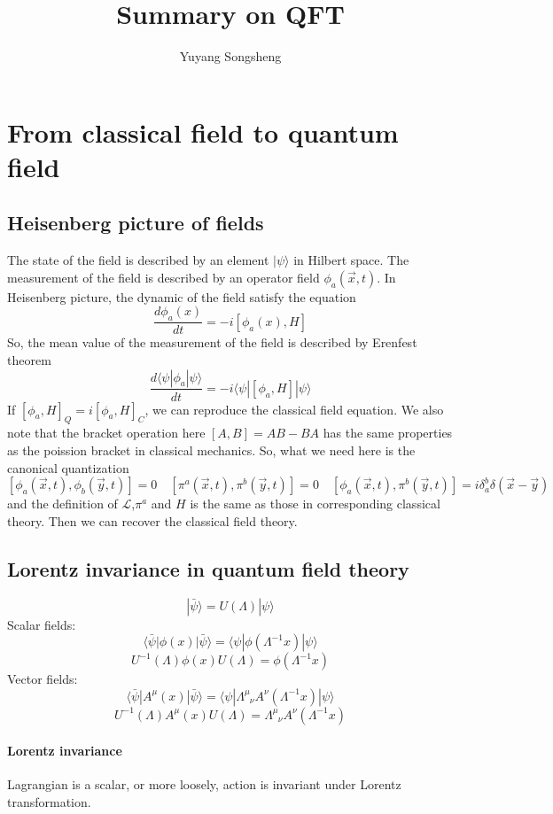 \documentclass{article}
\author{Yuyang Songsheng}
\title{Summary on QFT}
\begin{document}
\maketitle
\section{From classical field to quantum field}
\subsection{Heisenberg picture of fields}
The state of the field is described by an element $|\psi\rangle$ in Hilbert space. The measurement of the field is described by an operator field $\phi_a(\vec{x},t)$. In Heisenberg picture, the dynamic of the field satisfy the equation
\[\frac{d\phi_a(x)}{dt} = -i[\phi_a(x),H]\]
So, the mean value of the measurement of the field is described by Erenfest theorem
\[\frac{d\langle \psi| \phi_a | \psi \rangle}{dt} = -i \langle \psi | [\phi_a,H] | \psi \rangle\]
If $[\phi_a,H]_Q = i[\phi_a,H]_C$, we can reproduce the classical field equation. We also note that the bracket operation here $[A,B] = AB - BA$ has the same properties as the poission bracket in classical mechanics. So, what we need here is the canonical quantization
\[[\phi_a(\vec{x},t),\phi_b(\vec{y},t)] = 0 \quad [\pi^a(\vec{x},t),\pi^b(\vec{y},t)] = 0 \quad [\phi_a(\vec{x},t),\pi^b(\vec{y},t)] = i \delta_a^b \delta(\vec{x}-\vec{y}) \]
and the definition of $\mathcal{L}$,$\pi^a$ and $H$ is the same as those in corresponding classical theory. Then we can recover the classical field theory.

\subsection{Lorentz invariance in quantum field theory}
\[| \bar{\psi}\rangle = U(\Lambda)| \psi\rangle\]
Scalar fields:
\[\langle \bar{\psi} | \phi(x) | \bar{\psi}\rangle = \langle \psi | \phi(\Lambda^{-1}x) | \psi\rangle\]
\[U^{-1}(\Lambda) \phi(x) U(\Lambda) = \phi(\Lambda^{-1}x)\]
Vector fields:
\[\langle \bar{\psi} | A^{\mu}(x) | \bar{\psi}\rangle = \langle \psi | \Lambda^{\mu}_{\phantom{\mu}\nu} A^{\nu}(\Lambda^{-1}x) | \psi\rangle\]
\[U^{-1}(\Lambda) A^{\mu}(x) U(\Lambda) = \Lambda^{\mu}_{\phantom{\mu}\nu} A^{\nu}(\Lambda^{-1}x)\]
\paragraph{Lorentz invariance} Lagrangian is a scalar, or more loosely, action is invariant under Lorentz transformation.
\end{document}
